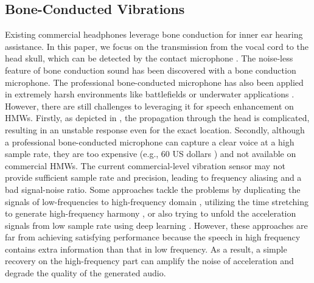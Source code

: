 \subsection{Bone-Conducted Vibrations}
Existing commercial headphones leverage bone conduction \citep{Bonecond79:online} for inner ear hearing assistance. In this paper, we focus on the transmission from the vocal cord to the head skull, which can be detected by the contact microphone \citep{Contactm68:online}. 
The noise-less feature of bone conduction sound has been discovered \citep{tagliasacchi2020seanet} with a bone conduction microphone. The professional bone-conducted microphone has also been applied in extremely harsh environments like battlefields or underwater applications \citep{EarBoneM7:online, BoneCond30:online}. However, there are still challenges to leveraging it for speech enhancement on HMWs. Firstly, as depicted in \citep{chang2016development, won2005estimating}, the propagation through the head is complicated, resulting in an unstable response even for the exact location. Secondly, although a professional bone-conducted microphone can capture a clear voice at a high sample rate, they are too expensive (e.g., 60 US dollars \citep{EarBoneM7:online, BoneCond30:online}) and not available on commercial HMWs.
The current commercial-level vibration sensor may not provide sufficient sample rate and precision, leading to frequency aliasing and a bad signal-noise ratio.
Some approaches tackle the problems by duplicating the signals of low-frequencies to high-frequency domain \citep{dietz2002spectral}, utilizing the time stretching to generate high-frequency harmony \citep{nagel2009harmonic}, or also trying to unfold the acceleration signals from low sample rate using deep learning \citep{wang2021audio}. However, these approaches are far from achieving satisfying performance because the speech in high frequency contains extra information than that in low frequency.
As a result, a simple recovery on the high-frequency part can amplify the noise of acceleration and degrade the quality of the generated audio.